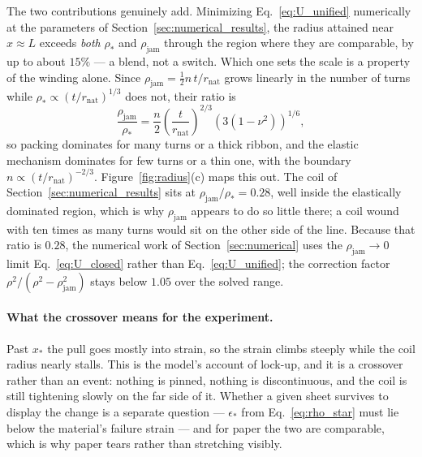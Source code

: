 \documentclass[11pt]{article}
\begin{document}
The two contributions genuinely add. Minimizing Eq.~\eqref{eq:U_unified}
numerically at the parameters of Section~\ref{sec:numerical_results}, the radius
attained near $x \approx L$ exceeds \emph{both} $\rho_*$ and
$\rho_{\mathrm{jam}}$ through the region where they are comparable, by up to
about $15\%$ --- a blend, not a switch. Which one sets the scale is a property of
the winding alone. Since
$\rho_{\mathrm{jam}} = \tfrac12 n\,t/r_{\mathrm{nat}}$ grows linearly in the
number of turns while
$\rho_* \propto \left(t/r_{\mathrm{nat}}\right)^{1/3}$ does not, their ratio is
\begin{equation}\label{eq:which_wins}
    \frac{\rho_{\mathrm{jam}}}{\rho_*}
      = \frac{n}{2}\left(\frac{t}{r_{\mathrm{nat}}}\right)^{2/3}
        \left(3\left(1-\nu^{2}\right)\right)^{1/6},
\end{equation}
so packing dominates for many turns or a thick ribbon, and the elastic mechanism
dominates for few turns or a thin one, with the boundary
$n \propto \left(t/r_{\mathrm{nat}}\right)^{-2/3}$. Figure~\ref{fig:radius}(c)
maps this out. The coil of Section~\ref{sec:numerical_results} sits at
$\rho_{\mathrm{jam}}/\rho_* = 0.28$, well inside the elastically dominated
region, which is why $\rho_{\mathrm{jam}}$ appears to do so little there; a coil
wound with ten times as many turns would sit on the other side of the line.
Because that ratio is $0.28$, the numerical work of
Section~\ref{sec:numerical} uses the $\rho_{\mathrm{jam}} \to 0$ limit
Eq.~\eqref{eq:U_closed} rather than Eq.~\eqref{eq:U_unified}; the correction
factor $\rho^{2}/\left(\rho^{2}-\rho_{\mathrm{jam}}^{2}\right)$ stays below
$1.05$ over the solved range.

\paragraph{What the crossover means for the experiment.} Past $x_*$ the pull goes
mostly into strain, so the strain climbs steeply while the coil radius nearly
stalls. This is the model's account of lock-up, and it is a crossover rather than
an event: nothing is pinned, nothing is discontinuous, and the coil is still
tightening slowly on the far side of it. Whether a given sheet survives to
display the change is a separate question --- $\epsilon_*$ from
Eq.~\eqref{eq:rho_star} must lie below the material's failure strain --- and for
paper the two are comparable, which is why paper tears rather than stretching
visibly.
\end{document}
